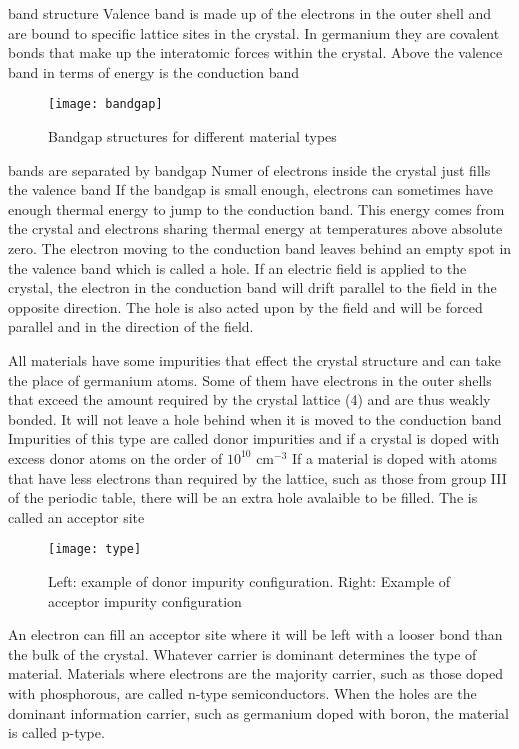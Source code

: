 band structure
Valence band is made up of the electrons in the outer shell and are bound to specific lattice sites in the crystal.
In germanium they are covalent bonds that make up the interatomic forces within the crystal.
Above the valence band in terms of energy is the conduction band
\begin{figure}[htpb]
\centering
\texttt{[image: bandgap]}
\caption{Bandgap structures for different material types}
\label{fig:bandgap}
\end{figure}
bands are separated by bandgap
Numer of electrons inside the crystal just fills the valence band
If the bandgap is small enough, electrons can sometimes have enough thermal energy to jump to the conduction band.
This energy comes from the crystal and electrons sharing thermal energy at temperatures above absolute zero.
The electron moving to the conduction band leaves behind an empty spot in the valence band which is called a hole.
If an electric field is applied to the crystal, the electron in the conduction band will drift parallel to the field in the opposite direction.
The hole is also acted upon by the field and will be forced parallel and in the direction of the field.

All materials have some impurities that effect the crystal structure and can take the place of germanium atoms.
Some of them have electrons in the outer shells that exceed the amount required by the crystal lattice (4) and are thus weakly bonded.
It will not leave a hole behind when it is moved to the conduction band
Impurities of this type are called donor impurities and if a crystal is doped with excess donor atoms on the order of $10^{10}$ cm$^{-3}$
If a material is doped with atoms that have less electrons than required by the lattice, such as those from group III of the periodic table, there will be an extra hole avalaible to be filled.
The is called an acceptor site
\begin{figure}[htpb]
\centering
\texttt{[image: type]}
\caption{Left: example of donor impurity configuration. Right: Example of acceptor impurity configuration}
\label{fig:type}
\end{figure}
An electron can fill an acceptor site where it will be left with a looser bond than the bulk of the crystal.
Whatever carrier is dominant determines the type of material.
Materials where electrons are the majority carrier, such as those doped with phosphorous, are called n-type semiconductors.
When the holes are the dominant information carrier, such as germanium doped with boron, the material is
 called p-type.

